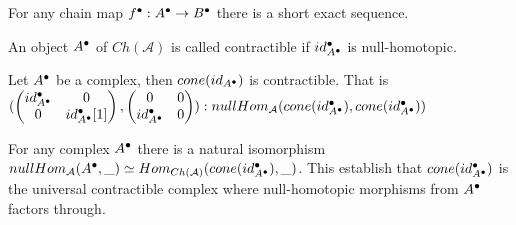    \begin{remark}
        For any chain map $f^{\bullet}:A^{\bullet}\rightarrow B^{\bullet}$ there is a short exact sequence.
        \begin{center}
        \end{center}
    \end{remark}

    \begin{definition}
        An object $A^{\bullet}$ of $Ch(\mathcal{A})$ is called contractible if $id_{A^{\bullet}}^{\bullet}$ is null-homotopic.
    \end{definition}

    \begin{example}
         Let $A^{\bullet}$ be a complex, then $cone(id_{A^{\bullet}})$ is contractible. That is \\$(\begin{pmatrix} id_{A^{\bullet}}^{\bullet} & 0 \\ 0 & id_{A^{\bullet}}^{\bullet}[1]\end{pmatrix},\begin{pmatrix} 0 & 0 \\ id_{A^{\bullet}}^{\bullet} & 0 \end{pmatrix}):nullHom_{\mathcal{A}}(cone(id_{A^{\bullet}}^{\bullet}), cone(id_{A^{\bullet}}^{\bullet}))$
    \end{example}

    \begin{prop}
        For any complex $A^{\bullet}$ there is a natural isomorphism $nullHom_{\mathcal{A}}(A^{\bullet},\_)\simeq Hom_{Ch(\mathcal{A})}(cone(id_{A^{\bullet}}^{\bullet}),\_)$. This establish that $cone(id_{A^{\bullet}}^{\bullet})$ is the universal contractible complex where null-homotopic morphisms from $A^{\bullet}$ factors through.
    \end{prop}

